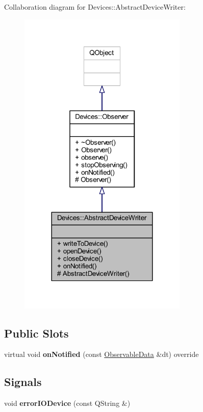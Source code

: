 Collaboration diagram for Devices\+:\+:Abstract\+Device\+Writer\+:\nopagebreak
\begin{figure}[H]
\begin{center}
\leavevmode
\includegraphics[width=228pt]{d2/dd2/class_devices_1_1_abstract_device_writer__coll__graph}
\end{center}
\end{figure}
\subsection*{Public Slots}
\begin{DoxyCompactItemize}
\item 
\mbox{\label{class_devices_1_1_abstract_device_writer_aa492a61c7df1e5588447a1fe4623b2bf}} 
virtual void {\bfseries on\+Notified} (const \hyperlink{class_devices_1_1_observable_data}{Observable\+Data} \&dt) override
\end{DoxyCompactItemize}
\subsection*{Signals}
\begin{DoxyCompactItemize}
\item 
\mbox{\label{class_devices_1_1_abstract_device_writer_aa882d8ef6221c76245ee8e5273caae85}} 
void {\bfseries error\+I\+O\+Device} (const Q\+String \&)
\end{DoxyCompactItemize}
